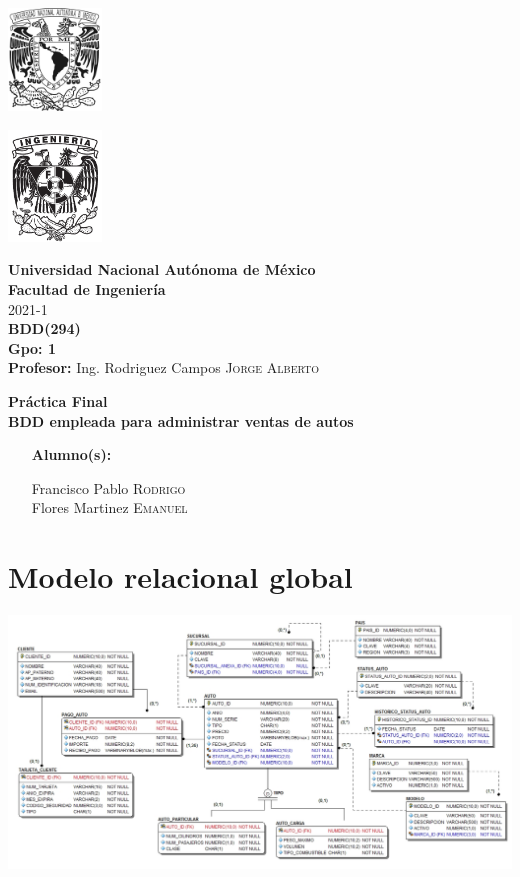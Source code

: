 \documentclass{article}
\newcommand{\coverPage}{
\thispagestyle{empty}
  \begin{minipage}[t][5cm][t]{0.2\linewidth}
    \includegraphics[width=2.5cm]{unam.jpg}

    \vspace{10cm}

    \includegraphics[width=2.5cm]{fiblack}
  \end{minipage}
  \begin{minipage}[t]{0.7\linewidth}
    \vspace{-2.5cm}
    \LARGE{\textbf{\university}}\\
    \Large{\textbf{\faculty}} \\
  
    \large{\semestre}\\[2cm]
  
    \large{\textbf{\materia (\clave)}}\\
    \large{\textbf{Gpo: \grupo}}\\[5mm]
    \large{\textbf{Profesor:} \profesor}\\ [1.5cm]
    \begin{center}
        \LARGE{\textbf{\actividad}}\\
        \LARGE{\textbf{\titulo}}\\
    \end{center}
  
    \vspace{3.3cm}
  
    \large{
      \begin{itemize}[ noitemsep, align=left ]
        \item [\textbf{Alumno(s):}] 
          \begin{flushright}
            \alumno
          \end{flushright}
      \end{itemize}
    } \vspace{1.5cm}
  
    \begin{flushright}
        \fechaEntrega%
    \end{flushright}
  \end{minipage}

\newpage
}
\begin{document}

\newcommand{\university}{Universidad Nacional Autónoma de México}
\newcommand{\faculty}{Facultad de Ingeniería}
\newcommand{\semestre}{2021-1}
\newcommand{\materia}{BDD}
\newcommand{\clave}{294}
\newcommand{\grupo}{1}
\newcommand{\profesor}{Ing. Rodriguez Campos \textsc{Jorge Alberto}}

\newcommand{\alumno}{
  Francisco Pablo \textsc{Rodrigo} \\ 
  Flores Martinez \textsc{Emanuel}   
}
\newcommand{\actividad}{Práctica Final}
\newcommand{\titulo}{BDD empleada para administrar ventas de autos}

\newcommand{\fechaEntrega}{}

\newcommand{\codedir}{codigo}
\graphicspath{{assets/}{bdd_proyecto.assets/}}

\coverPage%



\section*{Modelo relacional global}

\includegraphics[width=\linewidth]{modelo}\\

\end{document}

